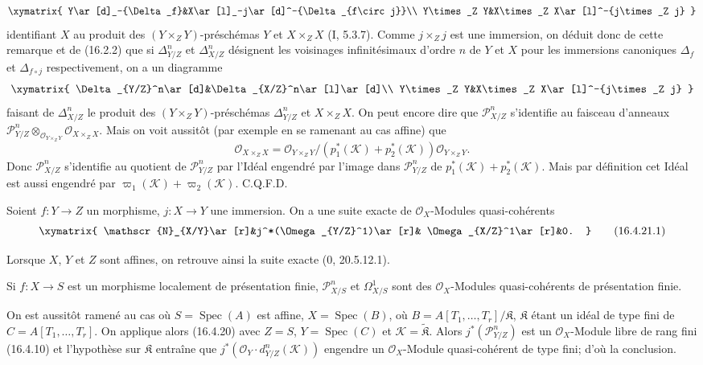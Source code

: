 \[
  \xymatrix{
    Y\ar[d]_-{\Delta_f}&X\ar[l]_-j\ar[d]^-{\Delta_{f\circ j}}\\
    Y\times_Z Y&X\times_Z X\ar[l]^-{j\times_Z j}
  }
\]
identifiant $X$ au produit des $(Y\times_Z Y)$-préschémas $Y$ et
$X\times_Z X$ (I, 5.3.7). Comme $j\times_Z j$ est une immersion, on déduit
donc de cette remarque et de (16.2.2) que si $\Delta_{Y/Z}^n$ et
$\Delta_{X/Z}^n$ désignent les voisinages infinitésimaux d'ordre $n$ de $Y$
et $X$ pour les immersions canoniques $\Delta_f$ et $\Delta_{f\circ j}$
respectivement, on a un diagramme
\[
  \xymatrix{
    \Delta_{Y/Z}^n\ar[d]&\Delta_{X/Z}^n\ar[l]\ar[d]\\
    Y\times_Z Y&X\times_Z X\ar[l]^-{j\times_Z j}
  }
\]
faisant de $\Delta_{X/Z}^n$ le produit des $(Y\times_Z Y)$-préschémas
$\Delta_{Y/Z}^n$ et $X\times_Z X$. On peut encore dire que
$\mathscr{P}_{X/Z}^n$ s'identifie au faisceau d'anneaux
$\mathscr{P}_{Y/Z}^n\otimes_{\mathcal{O}_{Y\times_Z Y}}
\mathcal{O}_{X\times_Z X}$. Mais on voit aussitôt (par exemple en se ramenant
au cas affine) que
\[
  \mathcal{O}_{X\times_Z X}=
  \mathcal{O}_{Y\times_Z Y}/
  (p_1^*(\mathscr{K})+p_2^*(\mathscr{K}))
  \mathcal{O}_{Y\times_Z Y}.
\]
Donc $\mathscr{P}_{X/Z}^n$ s'identifie au quotient de
$\mathscr{P}_{Y/Z}^n$ par l'Idéal engendré par l'image dans
$\mathscr{P}_{Y/Z}^n$ de $p_1^*(\mathscr{K})+p_2^*(\mathscr{K})$. Mais par
définition cet Idéal est aussi engendré par
$\varpi_1(\mathscr{K})+\varpi_2(\mathscr{K})$. C.Q.F.D.

\begin{corollary}[16.4.21]
\label{IV.16.4.21}
Soient $f:Y\to Z$ un morphisme, $j:X\to Y$ une immersion. On a une suite
exacte de $\mathcal{O}_X$-Modules quasi-cohérents
\[
  \xymatrix{
    \mathscr{N}_{X/Y}\ar[r]&j^*(\Omega_{Y/Z}^1)\ar[r]&
    \Omega_{X/Z}^1\ar[r]&0.
  }
  \tag{16.4.21.1}
  \label{IV.16.4.21.1}
\]
\end{corollary}

Lorsque $X$, $Y$ et $Z$ sont affines, on retrouve ainsi la suite exacte
(0, 20.5.12.1).

\begin{corollary}[16.4.22]
\label{IV.16.4.22}
Si $f:X\to S$ est un morphisme localement de présentation finie,
$\mathscr{P}_{X/S}^n$ et $\Omega_{X/S}^1$ sont des
$\mathcal{O}_X$-Modules quasi-cohérents de présentation finie.
\end{corollary}

On est aussitôt ramené au cas où $S=\operatorname{Spec}(A)$ est affine,
$X=\operatorname{Spec}(B)$, où
$B=A[T_1,\ldots,T_r]/\mathfrak{K}$, $\mathfrak{K}$ étant un idéal de type
fini de $C=A[T_1,\ldots,T_r]$. On applique alors (16.4.20) avec $Z=S$,
$Y=\operatorname{Spec}(C)$ et $\mathscr{K}=\widetilde{\mathfrak{K}}$. Alors
$j^*(\mathscr{P}_{Y/Z}^n)$ est un $\mathcal{O}_X$-Module libre de rang fini
(16.4.10) et l'hypothèse sur $\mathfrak{K}$ entraîne que
$j^*(\mathcal{O}_Y\cdot d_{Y/Z}^n(\mathscr{K}))$ engendre un
$\mathcal{O}_X$-Module quasi-cohérent de type fini; d'où la conclusion.

